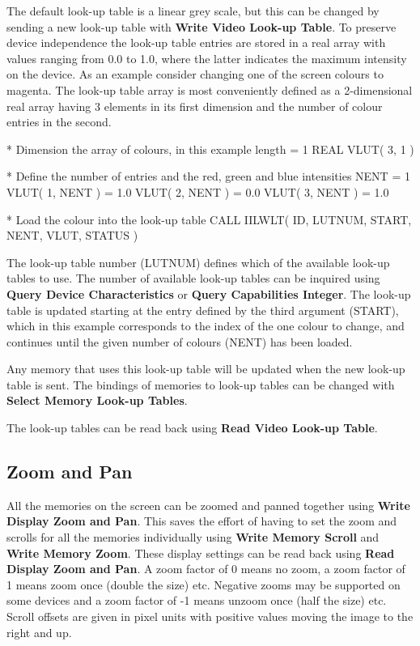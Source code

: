 \documentclass[11pt,nolof]{starlink}
\begin{document}
The default look-up table is a linear grey scale, but this can be changed
by sending a new look-up table with \textbf{Write Video Look-up Table}.
To preserve device independence the look-up table entries are stored
in a real array with values ranging from 0.0 to 1.0, where the latter
indicates the maximum intensity on the device. As an example consider
changing one of the screen colours to magenta. The look-up table array
is most conveniently defined as a 2-dimensional real array having 3
elements in its first dimension and the number of colour entries in the
second.
\begin{small}
\begin{terminalv}
*   Dimension the array of colours, in this example length = 1
      REAL VLUT( 3, 1 )

*   Define the number of entries and the red, green and blue intensities
      NENT = 1
      VLUT( 1, NENT ) = 1.0
      VLUT( 2, NENT ) = 0.0
      VLUT( 3, NENT ) = 1.0

*   Load the colour into the look-up table
      CALL IILWLT( ID, LUTNUM, START, NENT, VLUT, STATUS )
\end{terminalv}
\end{small}

The look-up table number (LUTNUM) defines which of the available
look-up tables to use. The number of available look-up tables can be
inquired using \textbf{Query Device Characteristics} or \textbf{Query
Capabilities Integer}. The look-up table
is updated starting at the entry defined by the third argument
(START), which in this example corresponds to the index of the
one colour to change, and continues until the given number of
colours (NENT) has been loaded.

Any memory that uses this look-up table will be updated when the new
look-up table is sent. The bindings of memories to look-up tables can
be changed with \textbf{Select Memory Look-up Tables}.

The look-up tables can be read back using \textbf{Read Video Look-up Table}.

\subsection{Zoom and Pan}

All the memories on the screen can be zoomed and panned together using
\textbf{Write Display Zoom and Pan}. This saves the effort of having to set
the zoom and scrolls for all the memories individually using \textbf{Write
Memory Scroll} and \textbf{Write Memory Zoom}. These display settings can be
read back using \textbf{Read Display Zoom and Pan}.
A zoom factor of 0 means no zoom, a zoom factor of 1 means zoom once
(double the size) etc. Negative zooms may be supported on some
devices and a zoom factor of -1 means unzoom once (half the size) etc.
Scroll offsets are given in pixel units with positive values moving
the image to the right and up.
\end{document}
